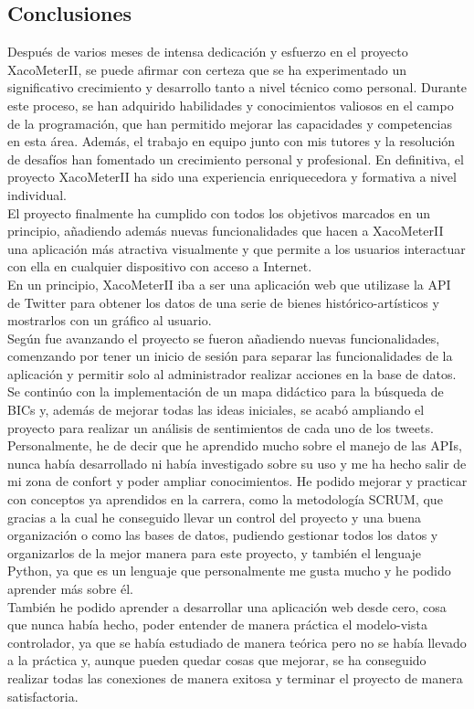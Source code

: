 

\subsection{Conclusiones}

Después de varios meses de intensa dedicación y esfuerzo en el proyecto XacoMeterII, se puede afirmar con certeza que se ha experimentado un significativo crecimiento y desarrollo tanto a nivel técnico como personal. Durante este proceso, se han adquirido habilidades y conocimientos valiosos en el campo de la programación, que han permitido mejorar las capacidades y competencias en esta área. Además, el trabajo en equipo junto con mis tutores y la resolución de desafíos han fomentado un crecimiento personal y profesional. En definitiva, el proyecto XacoMeterII ha sido una experiencia enriquecedora y formativa a nivel individual.\\

El proyecto finalmente ha cumplido con todos los objetivos marcados en un principio, añadiendo además nuevas funcionalidades que hacen a XacoMeterII una aplicación más atractiva visualmente y que permite a los usuarios interactuar con ella en cualquier dispositivo con acceso a Internet.\\

En un principio, XacoMeterII iba a ser una aplicación web que utilizase la API de Twitter para obtener los datos de una serie de bienes histórico-artísticos y mostrarlos con un gráfico al usuario.\\
Según fue avanzando el proyecto se fueron añadiendo nuevas funcionalidades, comenzando por tener un inicio de sesión para separar las funcionalidades de la aplicación y permitir solo al administrador realizar acciones en la base de datos. Se continúo con la implementación de un mapa didáctico para la búsqueda de BICs y, además de mejorar todas las ideas iniciales, se acabó ampliando el proyecto para realizar un análisis de sentimientos de cada uno de los tweets.\\

Personalmente, he de decir que he aprendido mucho sobre el manejo de las APIs, nunca había desarrollado ni había investigado sobre su uso y me ha hecho salir de mi zona de confort y poder ampliar conocimientos. He podido mejorar y practicar con conceptos ya aprendidos en la carrera, como la metodología SCRUM, que gracias a la cual he conseguido llevar un control del proyecto y una buena organización o como las bases de datos, pudiendo gestionar todos los datos y organizarlos de la mejor manera para este proyecto, y también el lenguaje Python, ya que es un lenguaje que personalmente me gusta mucho y he podido aprender más sobre él. \\
También he podido aprender a desarrollar una aplicación web desde cero, cosa que nunca había hecho, poder entender de manera práctica el modelo-vista controlador, ya que se había estudiado de manera teórica pero no se había llevado a la práctica y, aunque pueden quedar cosas que mejorar, se ha conseguido realizar todas las conexiones de manera exitosa y terminar el proyecto de manera satisfactoria.\\

